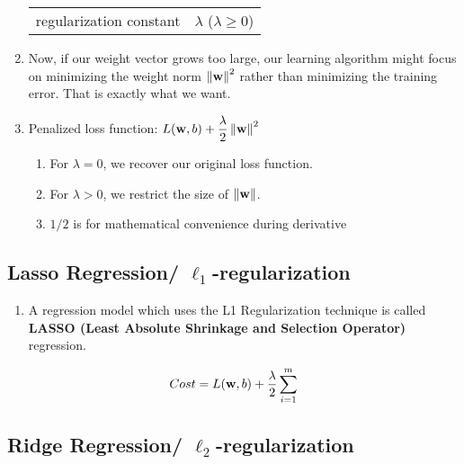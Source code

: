 \begin{enumerate}[itemsep=0.2cm]
\begin{customTableWrapper}{2}
\begin{table}[H]
\begin{tabular}{l l}
                regularization constant & $\lambda$ ($\lambda \geq 0$)\\

            \end{tabular}
        \end{table}
    \end{customTableWrapper}

    \item Now, if our weight vector grows too large, our learning algorithm might focus on minimizing the weight norm $\left\| \mathbf{w} \right\|^2$ rather than minimizing the training error. That is exactly what we want.

    \item Penalized loss function: $L(\mathbf{w}, b) + \dfrac{\lambda}{2} \left\| \mathbf{w} \right\|^2$
    \begin{enumerate}
        \item For $\lambda = 0$, we recover our original loss function.

        \item For $\lambda > 0$, we restrict the size of $\left\| \mathbf{w} \right\|$.

        \item $1/2$ is for mathematical convenience during derivative

    \end{enumerate}

\end{enumerate}



\subsection{Lasso Regression/ $\ell_1$-regularization \cite{dnn-1,geeksforgeeks.org/regularization-in-machine-learning}} \label{l1 regularization/ Lasso Regression}

\begin{enumerate}
    \item A regression model which uses the L1 Regularization technique is called \textbf{LASSO (Least Absolute Shrinkage and Selection Operator)} regression.

\end{enumerate}


\[
    Cost = L(\mathbf{w}, b) + \dfrac{\lambda}{2} \displaystyle\sum_{i=1}^m
\]


\subsection{Ridge Regression/ $\ell_2$-regularization \cite{dnn-1,geeksforgeeks.org/regularization-in-machine-learning}} \label{l1 regularization/ Ridge Regression}



